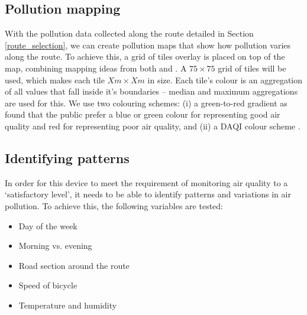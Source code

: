 \documentclass[11pt,twosided,a4paper]{report}
\begin{document}
%
%

\subsection{Pollution mapping}

With the pollution data collected along the route detailed in Section \ref{route_selection}, we can create pollution maps that show how pollution varies along the route. To achieve this, a grid of tiles overlay is placed on top of the map, combining mapping ideas from both \cite{Hoang2013hanoihexagons} and \cite{Hasenfratz2015highresmapsTram}. A $75 \times 75$ grid of tiles will be used, which makes each tile $Xm \times Xm$ in size. Each tile's colour is an aggregation of all values that fall inside it's boundaries -- median and maximum aggregations are used for this. We use two colouring schemes: (i) a green-to-red gradient as \cite{smallbone2012customerinsight} found that the public prefer a blue or green colour for representing good air quality and red for representing poor air quality, and (ii) a DAQI colour scheme \citep{defra2018daqi}.

\subsection{Identifying patterns}

In order for this device to meet the requirement of monitoring air quality to a `satisfactory level', it needs to be able to identify patterns and variations in air pollution. To achieve this, the following variables are tested:
\begin{itemize}
\item Day of the week
\item Morning vs. evening
\item Road section around the route
\item Speed of bicycle
\item Temperature and humidity
\end{itemize}
\end{document}
